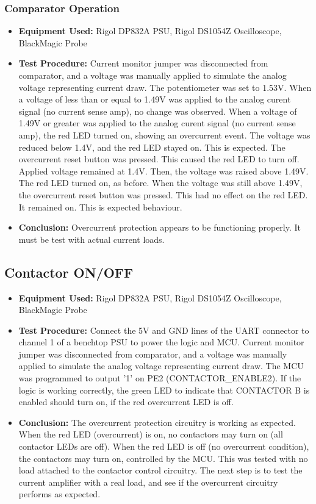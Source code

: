 \subsubsection{Comparator Operation}
  \begin{itemize}
        \item \textbf{Equipment Used:} Rigol DP832A PSU, Rigol DS1054Z Oscilloscope, BlackMagic Probe
        \item \textbf{Test Procedure:} Current monitor jumper was disconnected from comparator, and a voltage was manually applied to simulate the analog voltage representing current draw. The potentiometer was set to 1.53V. When a voltage of less than or equal to 1.49V was applied to the analog curent signal (no current sense amp), no change was observed. When a voltage of 1.49V or greater was applied to the analog curent signal (no current sense amp), the red LED turned on, showing an overcurrent event. The voltage was reduced below 1.4V, and the red LED stayed on. This is expected. The overcurrent reset button was pressed. This caused the red LED to turn off. Applied voltage remained at 1.4V. Then, the voltage was raised above 1.49V. The red LED turned on, as before. When the voltage was still above 1.49V, the overcurrent reset button was pressed. This had no effect on the red LED. It remained on. This is expected behaviour.
        \item \textbf{Conclusion:} Overcurrent protection appears to be functioning properly. It must be test with actual current loads.
  \end{itemize}
\subsection{Contactor ON/OFF}
  \begin{itemize}
        \item \textbf{Equipment Used:} Rigol DP832A PSU, Rigol DS1054Z Oscilloscope, BlackMagic Probe
        \item \textbf{Test Procedure:} Connect the 5V and GND lines of the UART connector to channel 1 of a benchtop PSU to power the logic and MCU. Current monitor jumper was disconnected from comparator, and a voltage was manually applied to simulate the analog voltage representing current draw. The MCU was programmed to output '1' on PE2 (CONTACTOR\_ENABLE2). If the logic is working correctly, the green LED to indicate that CONTACTOR B is enabled should turn on, if the red overcurrent LED is off.
        \item \textbf{Conclusion:} The overcurrent protection circuitry is working as expected. When the red LED (overcurrent) is on, no contactors may turn on (all contactor LEDs are off). When the red LED is off (no overcurrent condition), the contactors may turn on, controlled by the MCU. This was tested with no load attached to the contactor control circuitry. The next step is to test the current amplifier with a real load, and see if the overcurrent circuitry performs as expected. 
  \end{itemize}

